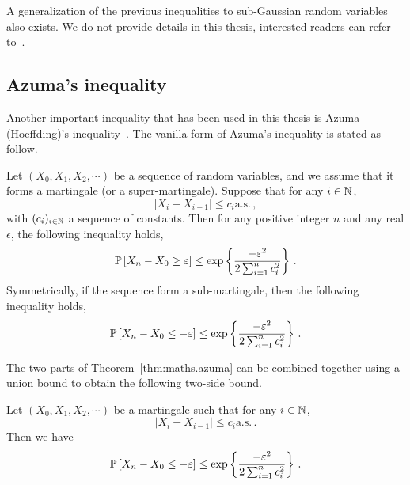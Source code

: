 A generalization of the previous inequalities to sub-Gaussian random variables also exists. We do not provide details in this thesis, interested readers can refer to~\cite{vershynin2018}.

\subsection{Azuma's inequality}

Another important inequality that has been used in this thesis is Azuma-(Hoeffding)'s inequality~\citep{azuma1967}. The vanilla form of Azuma's inequality is stated as follow.

\begin{theorem}\label{thm:maths.azuma}
\begin{leftbar}[theorembar]
    Let $(X_0, X_1, X_2, \cdots)$ be a sequence of random variables, and we assume that it forms a martingale (or a super-martingale). Suppose that for any $i\in{\mathbb N}$,
    \[
        |X_i-X_{i-1}|\leq c_i \text{a.s.}\,,
    \]
    with $(c_i)_{i\in{\mathbb N}}$ a sequence of constants. Then for any positive integer $n$ and any real $\epsilon$, the following inequality holds,
    \[
        \mathbb{P}\left[X_n-X_0 \geq \varepsilon\right] \leq \exp\left\{\frac{-\varepsilon^2}{2\sum_{i=1}^n c_i^2}\right\}\,.
    \]
    Symmetrically, if the sequence form a sub-martingale, then the following inequality holds,
    \[
        \mathbb{P}\left[X_n-X_0 \leq -\varepsilon\right] \leq \exp\left\{\frac{-\varepsilon^2}{2\sum_{i=1}^n c_i^2}\right\}\,.
    \]
\end{leftbar}
\end{theorem}

The two parts of Theorem~\ref{thm:maths.azuma} can be combined together using a union bound to obtain the following two-side bound.

\begin{corollary}\label{cor:maths.azuma}
\begin{leftbar}[corollarybar]
    Let $(X_0, X_1, X_2, \cdots)$ be a martingale such that for any $i\in{\mathbb N}$,
    \[
        |X_i-X_{i-1}|\leq c_i \text{a.s.}\,.
    \]
    Then we have
    \[
        \mathbb{P}\left[X_n-X_0 \leq -\varepsilon\right] \leq \exp\left\{\frac{-\varepsilon^2}{2\sum_{i=1}^n c_i^2}\right\}\,.
    \]
\end{leftbar}
\end{corollary}


